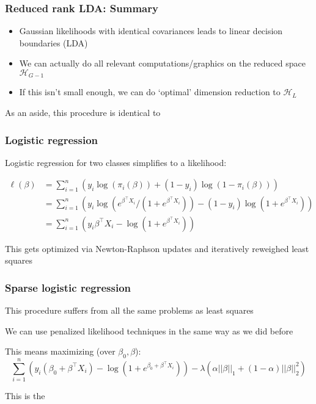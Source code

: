 \documentclass[12pt]{beamer}
\begin{document}
\begin{frame}
\frametitle{Reduced rank LDA: Summary}
\begin{itemize}
\item Gaussian likelihoods with identical covariances leads to linear decision boundaries (LDA)
\item We can actually do all relevant computations/graphics on the reduced space $\mathcal{H}_{G-1}$
\item If this isn't small enough, we can do `optimal' dimension reduction to $\mathcal{H}_L$
\end{itemize}
\vsp

As an aside, this procedure is identical to 
\end{frame}

\begin{frame}
\frametitle{Logistic regression}
Logistic regression for two classes simplifies to a likelihood:

\begin{align*}
\ell(\beta) 
& = 
\sum_{i=1}^n \left( y_i\log(\pi_i(\beta)) + (1-y_i)\log(1-\pi_i(\beta))\right) \\
& = 
\sum_{i=1}^n \left( y_i\log(e^{\beta^{\top}X_i}/(1+e^{\beta^{\top}X_i})) - (1-y_i)\log(1+e^{\beta^{\top}X_i})\right) \\
& = 
\sum_{i=1}^n \left( y_i\beta^{\top}X_i -\log(1 + e^{\beta^{\top} X_i})\right)
\end{align*}

This gets optimized via Newton-Raphson updates and iteratively reweighed least squares
\end{frame}

\begin{frame}
\frametitle{Sparse logistic regression}
This procedure suffers from all the same problems as least squares

\vsp
We can use penalized likelihood techniques in the same way as we did before

\vsp
This means maximizing (over $\beta_0,\beta$):
\[
\sum_{i=1}^n \left( y_i(\beta_0 + \beta^{\top}X_i) -\log(1 + e^{\beta_0 + \beta^{\top} X_i})\right)  
- \lambda (\alpha||\beta||_1+ (1-\alpha) ||\beta||_2^2)
\]

\vsp
This is the 
\end{frame}
\end{document}
